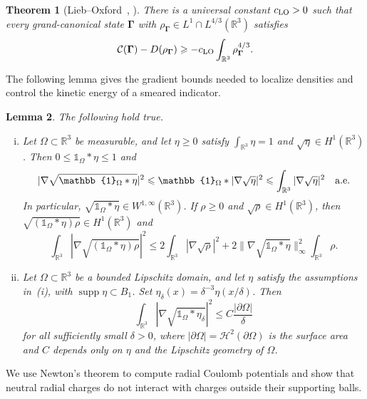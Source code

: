 \documentclass[final,reqno]{amsart}
\DeclareMathOperator{\supp}{supp}
\newtheorem{theorem}{Theorem}[section]
\newtheorem{lemma}[theorem]{Lemma}
\theoremstyle{remark}
\theoremstyle{definition}
\renewcommand{\le}{\leqslant}
\renewcommand{\ge}{\geqslant}
\newcommand{\RR}{\mathbb{R}}
\newcommand{\iden}{\mathbb{1}}
\newcommand{\Cc}{\mathcal{C}}
\newcommand{\vGamma}{{\bm{\Gamma}}}
\begin{document}
\begin{theorem}[{Lieb--Oxford~\cite{lieb1981improved}, \cite[Sec.~3.1]{lewin2020local}}]\label{thm:basic_lieb_oxford}
There is a universal constant $c_{\rm LO}>0$ such that every grand-canonical state $\vGamma$ with $\rho_{\vGamma}\in L^1\cap L^{4/3}(\RR^3)$ satisfies
\[
\Cc(\vGamma)-D(\rho_{\vGamma})\ge-c_{\rm LO}\int_{\RR^3}\rho_{\vGamma}^{4/3}.
\]
\end{theorem}

The following lemma gives the gradient bounds needed to localize densities and control the kinetic energy
of a smeared indicator.

\begin{lemma}\label{lem:basic_elementary}
The following hold true.
\begin{enumerate}[(i)]
\item Let $\Omega\subset\RR^3$ be measurable, and let $\eta\ge0$ satisfy $\int_{\RR^3}\eta=1$ and $\sqrt\eta\in H^1(\RR^3)$. Then $0\le\iden_\Omega*\eta\le1$ and
\begin{equation}\label{eq:basic_sqrt_cutoff}
|\nabla\sqrt{\iden_\Omega*\eta}|^2
\le\iden_\Omega*|\nabla\sqrt\eta|^2
\le\int_{\RR^3}|\nabla\sqrt\eta|^2
\quad\hbox{a.e.}
\end{equation}
In particular, $\sqrt{\iden_\Omega*\eta}\in W^{1,\infty}(\RR^3)$. If $\rho\ge0$ and $\sqrt\rho\in H^1(\RR^3)$, then $\sqrt{(\iden_\Omega*\eta)\rho}\in H^1(\RR^3)$ and
\[
\int_{\RR^3}|\nabla\sqrt{(\iden_\Omega*\eta)\rho}|^2
\le2\int_{\RR^3}|\nabla\sqrt\rho|^2
+2\|\nabla\sqrt{\iden_\Omega*\eta}\|_\infty^2\int_{\RR^3}\rho.
\]
\item Let $\Omega\subset\RR^3$ be a bounded Lipschitz domain, and let $\eta$ satisfy the assumptions in~(i), with $\supp\eta\subset B_1$. Set $\eta_\delta(x)=\delta^{-3}\eta(x/\delta)$. Then
\[
\int_{\RR^3}|\nabla\sqrt{\iden_\Omega*\eta_\delta}|^2
\le C\frac{|\partial\Omega|}{\delta}
\]
for all sufficiently small $\delta>0$, where $|\partial\Omega|=\mathcal H^2(\partial\Omega)$ is the surface area and $C$ depends only on $\eta$ and the Lipschitz geometry of $\Omega$.
\end{enumerate}
\end{lemma}

We use Newton's theorem to compute radial Coulomb potentials and show that neutral radial charges do not interact with charges outside their supporting balls.
\end{document}
